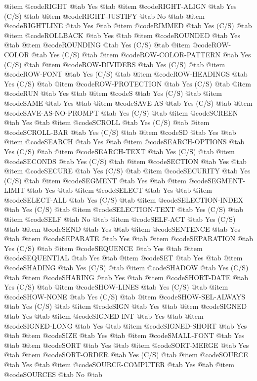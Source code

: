 @item @code{RIGHT} @tab Yes @tab 
@item @code{RIGHT-ALIGN} @tab Yes	(C/S) @tab 
@item @code{RIGHT-JUSTIFY} @tab No @tab 
@item @code{RIGHTLINE} @tab Yes @tab 
@item @code{RIMMED} @tab Yes	(C/S) @tab 
@item @code{ROLLBACK} @tab Yes @tab 
@item @code{ROUNDED} @tab Yes @tab 
@item @code{ROUNDING} @tab Yes	(C/S) @tab 
@item @code{ROW-COLOR} @tab Yes	(C/S) @tab 
@item @code{ROW-COLOR-PATTERN} @tab Yes	(C/S) @tab 
@item @code{ROW-DIVIDERS} @tab Yes	(C/S) @tab 
@item @code{ROW-FONT} @tab Yes	(C/S) @tab 
@item @code{ROW-HEADINGS} @tab Yes	(C/S) @tab 
@item @code{ROW-PROTECTION} @tab Yes	(C/S) @tab 
@item @code{RUN} @tab Yes @tab 
@item @code{S} @tab Yes	(C/S) @tab 
@item @code{SAME} @tab Yes @tab 
@item @code{SAVE-AS} @tab Yes	(C/S) @tab 
@item @code{SAVE-AS-NO-PROMPT} @tab Yes	(C/S) @tab 
@item @code{SCREEN} @tab Yes @tab 
@item @code{SCROLL} @tab Yes	(C/S) @tab 
@item @code{SCROLL-BAR} @tab Yes	(C/S) @tab 
@item @code{SD} @tab Yes @tab 
@item @code{SEARCH} @tab Yes @tab 
@item @code{SEARCH-OPTIONS} @tab Yes	(C/S) @tab 
@item @code{SEARCH-TEXT} @tab Yes	(C/S) @tab 
@item @code{SECONDS} @tab Yes	(C/S) @tab 
@item @code{SECTION} @tab Yes @tab 
@item @code{SECURE} @tab Yes	(C/S) @tab 
@item @code{SECURITY} @tab Yes	(C/S) @tab 
@item @code{SEGMENT} @tab Yes @tab 
@item @code{SEGMENT-LIMIT} @tab Yes @tab 
@item @code{SELECT} @tab Yes @tab 
@item @code{SELECT-ALL} @tab Yes	(C/S) @tab 
@item @code{SELECTION-INDEX} @tab Yes	(C/S) @tab 
@item @code{SELECTION-TEXT} @tab Yes	(C/S) @tab 
@item @code{SELF} @tab No @tab 
@item @code{SELF-ACT} @tab Yes	(C/S) @tab 
@item @code{SEND} @tab Yes @tab 
@item @code{SENTENCE} @tab Yes @tab 
@item @code{SEPARATE} @tab Yes @tab 
@item @code{SEPARATION} @tab Yes	(C/S) @tab 
@item @code{SEQUENCE} @tab Yes @tab 
@item @code{SEQUENTIAL} @tab Yes @tab 
@item @code{SET} @tab Yes @tab 
@item @code{SHADING} @tab Yes	(C/S) @tab 
@item @code{SHADOW} @tab Yes	(C/S) @tab 
@item @code{SHARING} @tab Yes @tab 
@item @code{SHORT-DATE} @tab Yes	(C/S) @tab 
@item @code{SHOW-LINES} @tab Yes	(C/S) @tab 
@item @code{SHOW-NONE} @tab Yes	(C/S) @tab 
@item @code{SHOW-SEL-ALWAYS} @tab Yes	(C/S) @tab 
@item @code{SIGN} @tab Yes @tab 
@item @code{SIGNED} @tab Yes @tab 
@item @code{SIGNED-INT} @tab Yes @tab 
@item @code{SIGNED-LONG} @tab Yes @tab 
@item @code{SIGNED-SHORT} @tab Yes @tab 
@item @code{SIZE} @tab Yes @tab 
@item @code{SMALL-FONT} @tab Yes @tab 
@item @code{SORT} @tab Yes @tab 
@item @code{SORT-MERGE} @tab Yes @tab 
@item @code{SORT-ORDER} @tab Yes	(C/S) @tab 
@item @code{SOURCE} @tab Yes @tab 
@item @code{SOURCE-COMPUTER} @tab Yes @tab 
@item @code{SOURCES} @tab No @tab 
